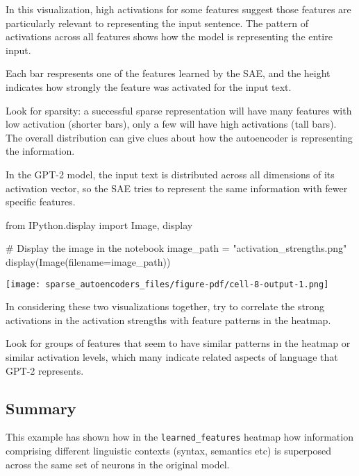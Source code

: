 \documentclass[
  letterpaper,
  DIV=11,
  numbers=noendperiod]{scrreprt}
\newenvironment{Shaded}{\begin{snugshade}}{\end{snugshade}}
\newcommand{\CommentTok}[1]{\textcolor[rgb]{0.37,0.37,0.37}{#1}}
\newcommand{\ImportTok}[1]{\textcolor[rgb]{0.00,0.46,0.62}{#1}}
\newcommand{\NormalTok}[1]{\textcolor[rgb]{0.00,0.23,0.31}{#1}}
\newcommand{\OperatorTok}[1]{\textcolor[rgb]{0.37,0.37,0.37}{#1}}
\newcommand{\StringTok}[1]{\textcolor[rgb]{0.13,0.47,0.30}{#1}}
\begin{document}
In this visualization, high activations for some features suggest those
features are particularly relevant to representing the input sentence.
The pattern of activations across all features shows how the model is
representing the entire input.

Each bar respresents one of the features learned by the SAE, and the
height indicates how strongly the feature was activated for the input
text.

Look for sparsity: a successful sparse representation will have many
features with low activation (shorter bars), only a few will have high
activations (tall bars). The overall distribution can give clues about
how the autoencoder is representing the information.

In the GPT-2 model, the input text is distributed across all dimensions
of its activation vector, so the SAE tries to represent the same
information with fewer specific features.

\begin{Shaded}
\begin{Highlighting}[]
\ImportTok{from}\NormalTok{ IPython.display }\ImportTok{import}\NormalTok{ Image, display}

\CommentTok{\# Display the image in the notebook}
\NormalTok{image\_path }\OperatorTok{=} \StringTok{"activation\_strengths.png"}
\NormalTok{display(Image(filename}\OperatorTok{=}\NormalTok{image\_path))}
\end{Highlighting}
\end{Shaded}

\texttt{[image: sparse\_autoencoders\_files/figure-pdf/cell-8-output-1.png]}

In considering these two visualizations together, try to correlate the
strong activations in the activation strengths with feature patterns in
the heatmap.

Look for groups of features that seem to have similar patterns in the
heatmap or similar activation levels, which many indicate related
aspects of language that GPT-2 represents.

\subsection{Summary}\label{summary}

This example has shown how in the \texttt{learned\_features} heatmap how
information comprising different linguistic contexts (syntax, semantics
etc) is superposed across the same set of neurons in the original model.
\end{document}
